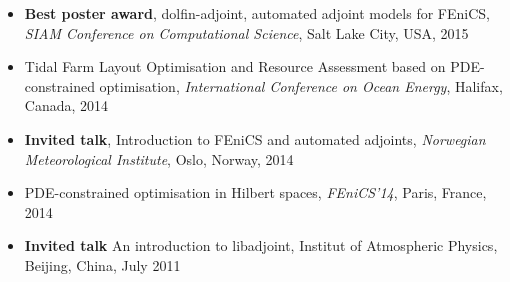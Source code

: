 \documentclass[11pt]{article}
\newenvironment{outerlist}[1][\enskip\textbullet]
        {\begin{itemize}[ #1]}{\end{itemize}}
\begin{document}
\begin{outerlist}
\item[] \textbf{Best poster award}, dolfin-adjoint, automated adjoint models for FEniCS, \textit{SIAM Conference on Computational Science}, Salt Lake City, USA, 2015
\item[] Tidal Farm Layout Optimisation and Resource Assessment based on PDE-constrained optimisation, \textit{International Conference on Ocean Energy}, Halifax, Canada, 2014
\item[] \textbf{Invited talk}, Introduction to FEniCS and automated adjoints, \textit{Norwegian Meteorological Institute}, Oslo, Norway, 2014
\item[] PDE-constrained optimisation in Hilbert spaces, \textit{FEniCS'14}, Paris, France, 2014
\item[] \textbf{Invited talk} An introduction to libadjoint, Institut of Atmospheric Physics, Beijing, China, July 2011
\end{outerlist}
\end{document}
